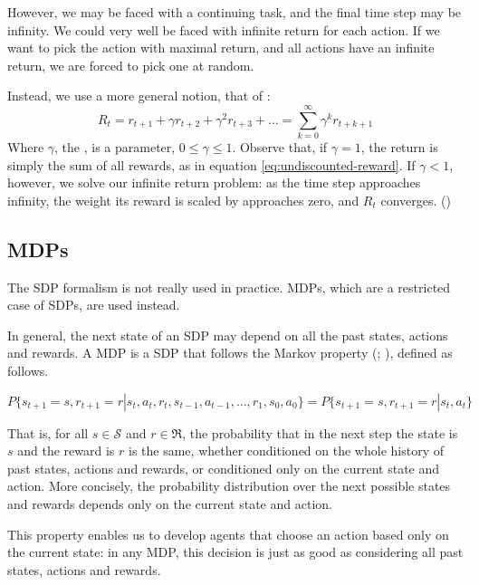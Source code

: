 However, we may be faced with a continuing task, and the final time step may be
infinity. We could very well be faced with infinite return for each action.
If we want to pick the action with maximal return, and all actions have an
infinite return, we are forced to pick one at random.

Instead, we use a more general notion, that of :
\begin{equation}
  R_t = r_{t+1} + \gamma r_{t+2} + \gamma^2 r_{t+3} + \dots = \sum_{k=0}^\infty
\gamma^k r_{t+k+1}
\end{equation}
Where $\gamma$, the , is a parameter, $0 \leq \gamma \leq
1$. Observe that, if $\gamma=1$, the return is simply the sum of all rewards, as
in equation \ref{eq:undiscounted-reward}. If $\gamma<1$, however, we solve our
infinite return problem: as the time step approaches infinity, the weight its
reward is scaled by approaches zero, and $R_t$ converges.
(\cite[Subsection~17.1.1]{russell2009aima})

\subsection{\aclp{MDP}}
The \ac{SDP} formalism is not really used in practice. \acfp{MDP}, which are a
restricted case of \acp{SDP}, are used instead.

In general, the next state of an \ac{SDP} may depend on all the past states,
actions and rewards. A \acl{MDP} is a \acl{SDP} that follows the Markov property
(\cite[Section~3.5]{sutton1998introduction};
\cite[Section~17.1]{russell2009aima}), defined as follows.

\begin{equation}
  P \lbrace s_{t+1} = s, r_{t+1} = r | s_t,a_t,r_t,s_{t-1},a_{t-1}, \dots, r_1, s_0, a_0 \rbrace =
  P \lbrace s_{t+1} = s, r_{t+1} = r | s_t,a_t \rbrace
\end{equation}

That is, for all $s\in\mathcal{S}$ and $r\in\mathfrak{R}$, the probability that
in the next step the state is $s$ and the reward is $r$ is the same, whether
conditioned on the whole history of past states, actions and rewards, or
conditioned only on the current state and action. More concisely, the
probability distribution over the next possible states and rewards depends only
on the current state and action.

This property enables us to develop agents that choose an action
based only on the current state: in any \ac{MDP}, this decision is just as good as
considering all past states, actions and rewards.

